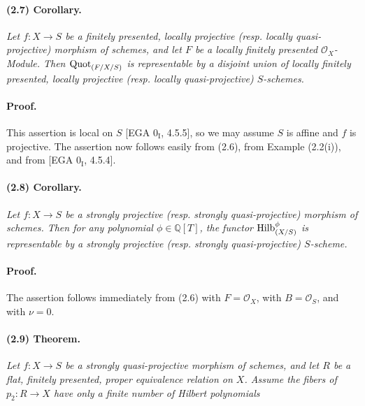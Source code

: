 \paragraph{(2.7) Corollary.}
\textit{Let $f:X\to S$ be a finitely presented, locally projective (resp.
locally quasi-projective) morphism of schemes, and let $F$ be a locally
finitely presented $\mathcal O_X$-Module. Then $\operatorname{Quot}_{(F/X/S)}$ is
representable by a disjoint union of locally finitely presented, locally
projective (resp. locally quasi-projective) $S$-schemes.}

\paragraph{Proof.}
This assertion is local on $S$ [EGA $0_{\mathrm I}$, 4.5.5], so we may
assume $S$ is affine and $f$ is projective. The assertion now follows easily
from (2.6), from Example (2.2(i)), and from [EGA $0_{\mathrm I}$, 4.5.4].

\paragraph{(2.8) Corollary.}
\textit{Let $f:X\to S$ be a strongly projective (resp. strongly
quasi-projective) morphism of schemes. Then for any polynomial
$\phi\in\mathbb Q[T]$, the functor $\operatorname{Hilb}^{\phi}_{(X/S)}$ is representable
by a strongly projective (resp. strongly quasi-projective) $S$-scheme.}

\paragraph{Proof.}
The assertion follows immediately from (2.6) with $F=\mathcal O_X$, with
$B=\mathcal O_S$, and with $\nu=0$.

\paragraph{(2.9) Theorem.}
\textit{Let $f:X\to S$ be a strongly quasi-projective morphism of schemes,
and let $R$ be a flat, finitely presented, proper equivalence relation on
$X$. Assume the fibers of $p_2:R\to X$ have only a finite number of Hilbert
polynomials}
